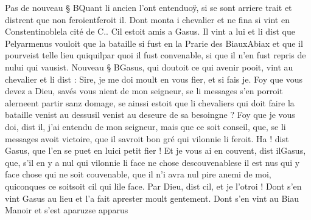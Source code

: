 \documentclass{article}
\begin{document}
\begin{pages}
            \pstart Pas de nouveau § BQuant
               li ancien l’ont 
                  entenduoÿ, si se sont arriere trait et distrent que non 
                  feroientferoit il. Dont monta i chevalier
               et ne fina si vint en 
                  Constentinoblela cité de C.. Cil estoit amis a Gasus. Il vint a lui et li
               dist que Pelyarmenus vouloit que la bataille 
                     si fust en la Prarie des 
                        BiauxAbiax et que il pourveist 
                     telle lieu 
                     quiquilpar quoi il fust convenable, si que il n’en fust repris de nului qui vausist.
                  Nouveau § BGasus, qui
               doutoit ce qui avenir pooit, vint au chevalier et li dist : Sire, je me doi
                  moult en vous fier, et si fais je. Foy que vous devez a Dieu, savés vous nient de
                     mon seigneur, se li messages s’en porroit 
                     alerneent partir sanz domage, se ainssi estoit que 
                     li
                           chevaliers qui doit faire la bataille venist au
                        dessusil venist au deseure de sa besoingne ?
               Foy que je vous doi, dist il, j’ai entendu de mon seigneur, mais que ce soit conseil,
                  que, se li messages avoit victoire, 
                     que il savroit bon gré qui vilonnie li feroit.
               Ha ! dist Gasus,
                  que l’en se puet 
                     en luici petit fier ! Et je vous ai en couvent, dist 
                     ilGasus, que, 
                     s’il en y a nul qui vilonnie li face ne chose
                        descouvenablese il est nus qui y face chose qui ne soit couvenable, que il n’i avra 
                     nul pire anemi de moi, quiconques 
                     ce soitsoit cil qui 
                     lile face.
               Par Dieu, dist cil, et je l’otroi ! Dont s’en
               vint Gasus au lieu et l’a fait aprester moult
               gentement. Dont s’en vint au Biau Manoir et 
                  s’est aparuzse apparus
               

\end{pages}
\end{document}
